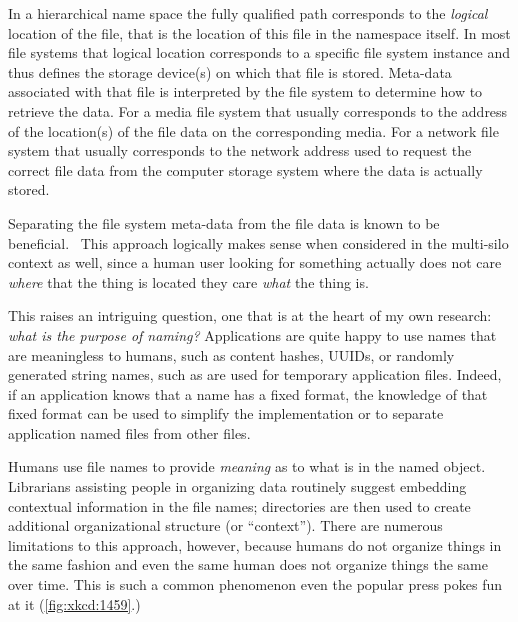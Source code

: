 In a hierarchical name space the fully qualified path corresponds to the
\emph{logical} location of the file, that is the location of this file in the
namespace itself. In most file systems that logical location corresponds to a
specific file system instance and thus defines the storage device(s) on which
that file is stored.  Meta-data associated with that file is interpreted by the
file system to determine how to retrieve the data.  For a media file system that
usually corresponds to the address of the location(s) of the file data on the
corresponding media.  For a network file system that usually corresponds to the
network address used to request the correct file data from the computer storage
system where the data is actually stored.

Separating the file system meta-data from the file data is known to be
beneficial.~\cite{kawai2011a}  This approach logically makes sense when
considered in the multi-silo context as well, since a human user looking for
something actually does not care \textit{where} that the
thing is located they care \emph{what} the thing is.

This raises an intriguing question, one that is at the heart of my own research:
\emph{what is the purpose of naming?}  Applications are quite happy to use names
that are meaningless to humans, such as content hashes, UUIDs, or randomly
generated string names, such as are used for temporary application files.
Indeed, if an application knows that a name has a fixed format, the knowledge of
that fixed format can be used to simplify the implementation or to separate
application named files from other files.

Humans use file names to provide \emph{meaning} as to what is in the named
object.  Librarians assisting people in organizing data routinely suggest
embedding contextual information in the file names; directories are then used to
create additional organizational structure (or ``context''). There are numerous
limitations to this approach, however, because humans do not organize things in
the same fashion and even the same human does not organize things the same over
time. This is such a common phenomenon even the popular press pokes fun at it
(\autoref{fig:xkcd:1459}.)

